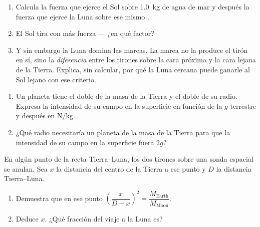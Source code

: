 \begin{exercise}[$\star\star$]\label{exo:g10:universal-gravitation:10}
\begin{enumerate}
  \item Calcula la fuerza que ejerce el Sol sobre \qty{1.0}{kg} de agua
        de mar y después la fuerza que ejerce la Luna sobre ese mismo
        .
  \item El Sol tira con más fuerza --- ¿en qué factor?
  \item Y sin embargo la Luna domina las mareas. La marea no la produce
        el tirón en sí, sino la \emph{diferencia} entre los tirones
        sobre la cara próxima y la cara lejana de la Tierra. Explica,
        sin calcular, por qué la Luna cercana puede ganarle al Sol
        lejano con ese criterio.
\end{enumerate}
\end{exercise}

\begin{exercise}[$\star\star$]\label{exo:g10:universal-gravitation:11}
\begin{enumerate}
  \item Un planeta tiene el doble de la masa de la Tierra y el doble de
        su radio. Expresa la intensidad de su campo en la superficie en
        función de la $g$ terrestre y después en \unit{N/kg}.
  \item ¿Qué radio necesitaría un planeta de la masa de la Tierra para
        que la intensidad de su campo en la superficie fuera $2g$?
\end{enumerate}
\end{exercise}

\begin{exercise}[$\star\star\star$]\label{exo:g10:universal-gravitation:12}
En algún punto de la recta Tierra--Luna, los dos tirones sobre una sonda
espacial se anulan. Sea $x$ la distancia del centro de la Tierra a ese
punto y $D$ la distancia Tierra--Luna.
\begin{enumerate}
  \item Demuestra que en ese punto
        $\left(\dfrac{x}{D - x}\right)^{2}
        = \dfrac{M_{\text{Earth}}}{M_{\text{Moon}}}$.
  \item Deduce $x$. ¿Qué fracción del viaje a la Luna es?
\end{enumerate}
\end{exercise}

